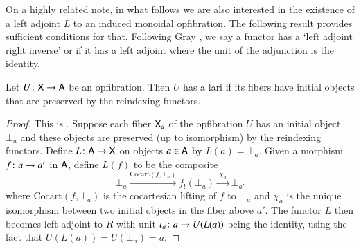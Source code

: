 \documentclass[reqno]{amsart}
\begin{document}

On a highly related note, in what follows we are also interested in the existence of a left adjoint $L$ to an induced monoidal opfibration.  The following result provides sufficient conditions for that.  Following Gray \cite{Gray}, we say a functor has a `left adjoint right inverse' or  if it has a left adjoint where the unit of the adjunction is the identity.

\begin{lem} \label{prop:opfibtolari}
Let $U \colon\mathsf{X} \to \mathsf{A}$ be an opfibration.   Then $U$ has a lari if its fibers have initial objects
that are preserved by the reindexing functors.
\end{lem}

\begin{proof}
 This is \cite[Proposition~4.4]{Gray}.    Suppose each fiber $\mathsf{X}_a$ of the opfibration $U$ has an initial object $\bot_a$ and these objects are preserved (up to isomorphism) by the reindexing functors.   Define $L \colon \mathsf{A} \to \mathsf{X}$ on objects $a \in \mathsf{A}$ by $L(a) = \bot_a$.   Given a morphism $f\colon a\to a'$ in $\mathsf{A}$, define $L(f)$ to be the composite
 \begin{equation}\label{eq:Lonarrows}
  \bot_a\xrightarrow{\mathrm{Cocart}(f,\bot_a)}f_!(\bot_a)\xrightarrow{\;\chi_a\;}\bot_{a'}
 \end{equation}
where $\mathrm{Cocart}(f,\bot_a)$ is the cocartesian lifting of $f$ to $\bot_a$ and $\chi_a$ is the unique isomorphism between two initial objects in the fiber above $a'$.    The functor $L$ then becomes left adjoint to $R$ with unit $\iota_a \colon a \to U(L(a))$ being the identity, using the fact that $U(L(a)) = U(\bot_a) = a$.
\end{proof}
\end{document}
